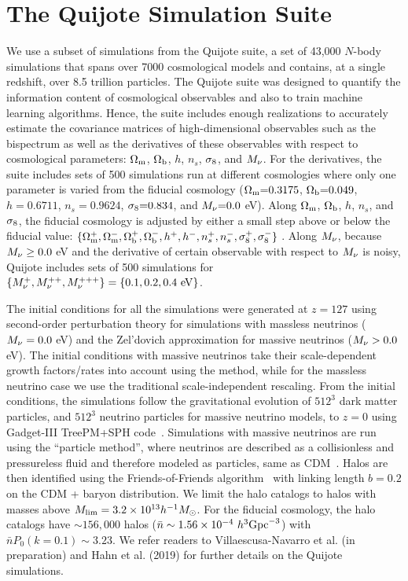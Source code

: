 \section{The Quijote Simulation Suite} \label{sec:sims}
We use a subset of simulations from the Quijote suite, a set of 43,000 $N$-body 
simulations that spans over 7000 cosmological models and contains, at a single 
redshift, over 8.5 trillion particles. The Quijote suite was designed to quantify
the information content of cosmological observables and also to train machine 
learning algorithms. Hence, the suite includes enough realizations to accurately 
estimate the covariance matrices of high-dimensional observables such as the 
bispectrum as well as the derivatives of these observables with respect to 
cosmological parameters: $\Omega_{\rm m}$, $\Omega_{\rm b}$, $h$, $n_s$, $\sigma_8$, and $M_\nu$. For
the derivatives, the suite includes sets of 500 simulations run at different 
cosmologies where only one parameter is varied from the fiducial cosmology  
($\Omega_{\rm m}{=}0.3175$, $\Omega_{\rm b}{=}0.049$, $h{=}0.6711$, $n_s{=}0.9624$, $\sigma_8{=}0.834$, and 
$M_\nu{=}0.0$ eV). Along $\Omega_{\rm m}$, $\Omega_{\rm b}$, $h$, $n_s$, and $\sigma_8$, the fiducial 
cosmology is adjusted by either a small step above or below the fiducial value:
$\{\Omega_{\rm m}^{+}, \Omega_{\rm m}^{-}, \Omega_{\rm b}^{+}, \Omega_{\rm b}^{-}, h^+, h^-, n_s^{+}, n_s^{-}, \sigma_8^{+}, \sigma_8^-\}$ . 
Along $M_\nu$, because $M_\nu \ge 0.0$ eV and the derivative of certain observable 
with respect to $M_\nu$ is noisy, Quijote includes sets of 500 simulations for 
$\{M_\nu^{+}, M_\nu^{++}, M_\nu^{+++} \} = \{0.1, 0.2, 0.4~{\rm eV}\}$.

The initial conditions for all the simulations were generated at $z=127$ using 
second-order perturbation theory for simulations with massless neutrinos 
($M_\nu = 0.0$ eV) and the Zel’dovich approximation for massive neutrinos 
($M_\nu > 0.0$ eV). The initial conditions with massive neutrinos take 
their scale-dependent growth factors/rates into account using the 
\cite{zennaro2017a} method, while for the massless neutrino case we use 
the traditional scale-independent rescaling. From the initial conditions, 
the simulations follow the gravitational evolution of $512^3$ dark matter
particles, and $512^3$ neutrino particles for massive neutrino models, to 
$z=0$ using {\sc Gadget-III} TreePM+SPH code~\citep{springel2005}. 
Simulations with massive neutrinos are run using the ``particle method'', 
where neutrinos are described as a collisionless and pressureless fluid 
and therefore modeled as particles, same as CDM~\citep{brandbyge2008,viel2010}.
Halos are then identified using the Friends-of-Friends algorithm~\citep[FoF;][]{davis1985} 
with linking length $b=0.2$ on the CDM + baryon distribution. We limit 
the halo catalogs to halos with masses above 
$M_{\rm lim} = 3.2\times 10^{13} h^{-1}M_\odot$.
For the fiducial cosmology, the halo catalogs have ${\sim}156,000$ halos 
($\bar{n} \sim 1.56 \times 10^{-4}~h^3{\rm Gpc}^{-3}$) with $\bar{n} P_0(k=0.1)\sim 3.23$. 
We refer readers to Villaescusa-Navarro et al. (in preparation) and Hahn et al. (2019) 
for further details on the Quijote simulations.

